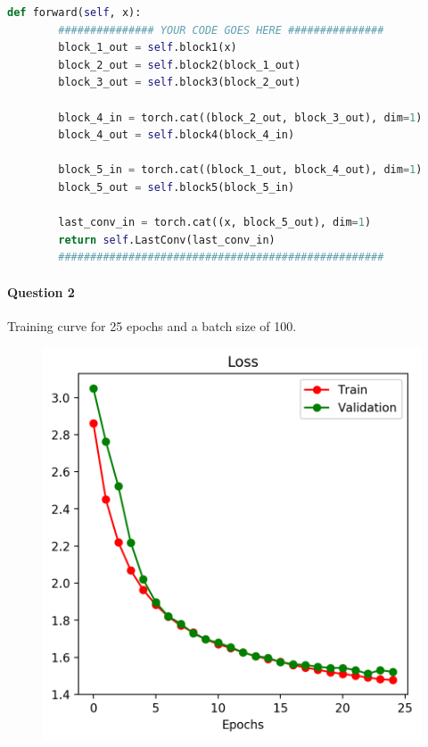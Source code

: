 \documentclass[12pt]{article}
\begin{document}
\begin{lstlisting}[language=python]
    def forward(self, x):
        ############### YOUR CODE GOES HERE ###############
        block_1_out = self.block1(x)
        block_2_out = self.block2(block_1_out)
        block_3_out = self.block3(block_2_out)

        block_4_in = torch.cat((block_2_out, block_3_out), dim=1)
        block_4_out = self.block4(block_4_in)

        block_5_in = torch.cat((block_1_out, block_4_out), dim=1)
        block_5_out = self.block5(block_5_in)

        last_conv_in = torch.cat((x, block_5_out), dim=1)
        return self.LastConv(last_conv_in)
        ###################################################
	\end{lstlisting}
	\paragraph{Question 2} Training curve for 25 epochs and a batch size of 100.
	\begin{figure}[H]
		\centering
		\includegraphics[width=\linewidth]{figures/partb_q2.png}
	\end{figure}
	
\end{document}

